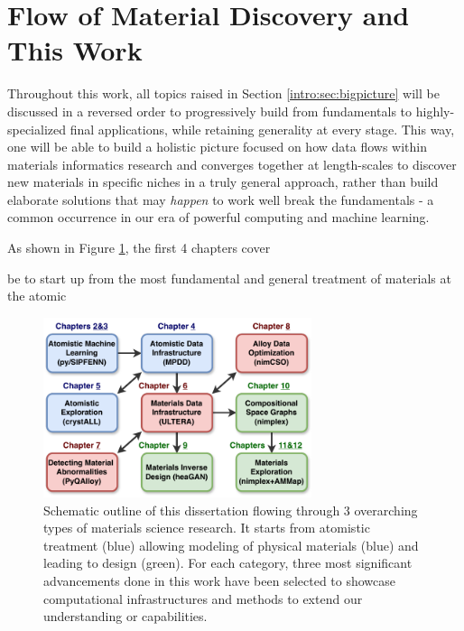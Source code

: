 \cite{Krajewski2024Nimplex}





\section{Flow of Material Discovery and This Work} \label{intro:sec:flow}

Throughout this work, all topics raised in Section \ref{intro:sec:bigpicture} will be discussed in a reversed order to progressively build from fundamentals to highly-specialized final applications, while retaining generality at every stage. This way, one will be able to build a holistic picture focused on how data flows within materials informatics research and converges together at length-scales to discover new materials in specific niches in a truly general approach, rather than build elaborate solutions that may \emph{happen} to work well break the fundamentals - a common occurrence in our era of powerful computing and machine learning.

As shown in Figure \ref{intro:fig:outline}, the first 4 chapters cover 


be to start up from the most fundamental and general treatment of materials at the atomic 


\begin{figure}[H]
    \centering
    \includegraphics[width=0.7\textwidth]{intro/DissertationOutline.pdf}
    \caption{Schematic outline of this dissertation flowing through 3 overarching types of materials science research. It starts from atomistic treatment (blue) allowing modeling of physical materials (blue) and leading to design (green). For each category, three most significant advancements done in this work have been selected to showcase computational infrastructures and methods to extend our understanding or capabilities.}
    \label{intro:fig:outline}
\end{figure}


